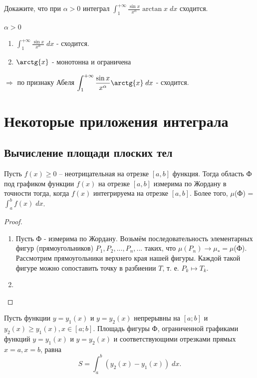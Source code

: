     \begin{example}
    	Докажите, что при $\alpha > 0$ интеграл $\displaystyle \int_1^{+\infty} \frac{\sin{x}}{x^{\alpha}} \arctan{x} \; dx$ сходится.
    \end{example}
    
    $\alpha > 0$
    \begin{enumerate}
    	\item $\displaystyle \int_1^{+\infty} \frac{\sin{x}}{x^{\alpha}} \; dx$ - сходится.
    	\item $\arctg{x}$ - монотонна и ограничена
    \end{enumerate}
    $\Rightarrow$ по признаку Абеля $\displaystyle \int_1^{+\infty} \frac{\sin{x}}{x^{\alpha}} \arctg{x} \; dx$ - сходится.
    
    \chapter{Некоторые приложения интеграла}
    
    \section{Вычисление площади плоских тел}
    
    \begin{sentence}
    	Пусть $f(x) \geqslant 0$ – неотрицательная на отрезке $[a, b]$ функция. Тогда область Ф под графиком функции $f(x)$ на отрезке $[a, b]$ измерима по Жордану в точности тогда, когда $f(x)$ интегрируема на отрезке $[a, b]$. Более того, $\mu$(Ф) = $\int_a^b f(x) \; dx$.
    \end{sentence}

    \begin{proof}
    	\begin{enumerate}
    		\item Пусть Ф - измерима по Жордану. Возьмём последовательность элементарных фигур (прямоугольников) $P_1, P_2, ..., P_n, ...$ таких, что $\mu(P_n) \to \mu_{*} = \mu$(Ф). Рассмотрим прямоугольники верхнего края нашей фигуры. Каждой такой фигуре можно сопоставить точку в разбиении $T$, т. е. $P_k \mapsto T_k$.
    		\item
    	\end{enumerate}
    \end{proof}
    
    \begin{theorem}
    	Пусть функции $y = y_1(x)$ и $y = y_2(x)$ непрерывны на $[a; b]$ и $y_2(x) \geqslant y_1(x), x \in [a; b]$. Площадь фигуры Ф, ограниченной графиками функций $y = y_1(x)$ и $y = y_2(x)$ и соответствующими отрезками прямых $x = a, x = b$, равна
    	\[ S = \int_a^b (y_2(x) - y_1(x)) \; dx. \]
    \end{theorem}
    

